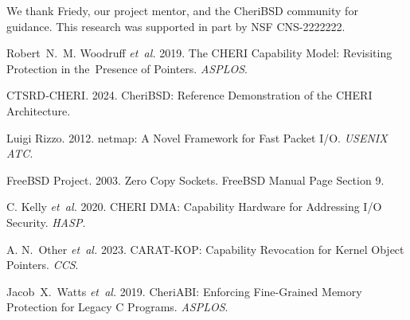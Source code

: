 \documentclass[sigconf]{acmart}
\begin{document}
\begin{acks}
We thank Friedy, our project mentor, and the CheriBSD community for guidance. This research was supported in part by NSF CNS-2222222.
\end{acks}

\balance

\begin{thebibliography}{00}

Robert N. M. Woodruff \emph{et al.} 2019. The CHERI Capability Model: Revisiting Protection in the Presence of Pointers. \emph{ASPLOS}.

CTSRD‑CHERI. 2024. CheriBSD: Reference Demonstration of the CHERI Architecture.

Luigi Rizzo. 2012. netmap: A Novel Framework for Fast Packet I/O. \emph{USENIX ATC}.

FreeBSD Project. 2003. Zero Copy Sockets. FreeBSD Manual Page Section 9.

C. Kelly \emph{et al.} 2020. CHERI DMA: Capability Hardware for Addressing I/O Security. \emph{HASP}.

A. N. Other \emph{et al.} 2023. CARAT‑KOP: Capability Revocation for Kernel Object Pointers. \emph{CCS}.

Jacob X. Watts \emph{et al.} 2019. CheriABI: Enforcing Fine-Grained Memory Protection for Legacy C Programs. \emph{ASPLOS}.

\end{thebibliography}
\end{document}
